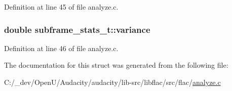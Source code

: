 Definition at line 45 of file analyze.\+c.

\subsubsection[{\texorpdfstring{variance}{variance}}]{\setlength{\rightskip}{0pt plus 5cm}double subframe\+\_\+stats\+\_\+t\+::variance}\hypertarget{structsubframe__stats__t_a72a259cebf1d47bc52c96599481bec41}{}\label{structsubframe__stats__t_a72a259cebf1d47bc52c96599481bec41}


Definition at line 46 of file analyze.\+c.



The documentation for this struct was generated from the following file\+:\begin{DoxyCompactItemize}
\item 
C\+:/\+\_\+dev/\+Open\+U/\+Audacity/audacity/lib-\/src/libflac/src/flac/\hyperlink{analyze_8c}{analyze.\+c}\end{DoxyCompactItemize}
